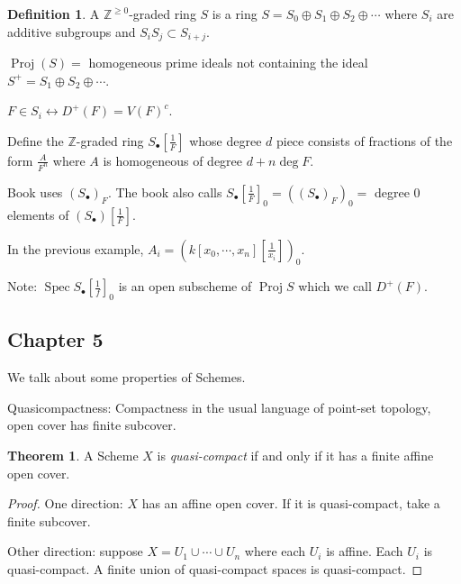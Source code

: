 \documentclass{article}
\theoremstyle{definition}
\newtheorem*{definition}{Definition}
\newtheorem{theorem}{Theorem}
\begin{document}
    \begin{definition}
        A \(\mathbb{Z}^{\geq 0}\)-graded ring \(S\) is a ring \(S = S_0 \oplus S_1 \oplus S_2 \oplus \cdots\) where \(S_i\) are additive subgroups and \(S_i S_j \subset S_{i+j}\).

        \(\operatorname{Proj} (S) =\) homogeneous prime ideals not containing the ideal \(S^+ = S_1 \oplus S_2 \oplus \cdots\).

        \(F\in S_i \leftrightarrow D^+(F) = V(F)^{c}\).
        
        Define the \(\mathbb{Z}\)-graded ring \(S_\bullet \left[ \frac{1}{F} \right] \) whose degree \(d\) piece consists of fractions of the form \(\frac{A}{F^n}\) where \(A\) is homogeneous of degree \(d + n \operatorname{deg} F\).

        Book uses \((S_\bullet)_F\). The book also calls \(S_{\bullet}\left[ \frac{1}{F} \right]_0 = ((S_\bullet)_F)_0 =\) degree \(0\) elements of \((S_\bullet) \left[ \frac{1}{F} \right] \).
        
        In the previous example, \(A_i = \left( k[x_0, \cdots , x_n] \left[ \frac{1}{x_i} \right] \right)_0\).
        
        Note: \(\operatorname{Spec} S_\bullet \left[ \frac{1}{f} \right]_0\) is an open subscheme of \(\operatorname{Proj} S\) which we call \(D^+ (F)\).
    \end{definition}

    \subsection*{Chapter 5}

    We talk about some properties of Schemes.

    Quasicompactness: Compactness in the usual language of point-set topology, open cover has finite subcover.

    \begin{theorem}
        A Scheme \(X\) is \textit{quasi-compact} if and only if it has a finite affine open cover. 
    \end{theorem}

    \begin{proof}
        One direction: \(X\) has an affine open cover. If it is quasi-compact, take a finite subcover.

        Other direction: suppose \(X = U_1 \cup \cdots \cup U_n\) where each \(U_i\) is affine. Each \(U_i\) is quasi-compact. A finite union of quasi-compact spaces is quasi-compact.

    \end{proof}
\end{document}
